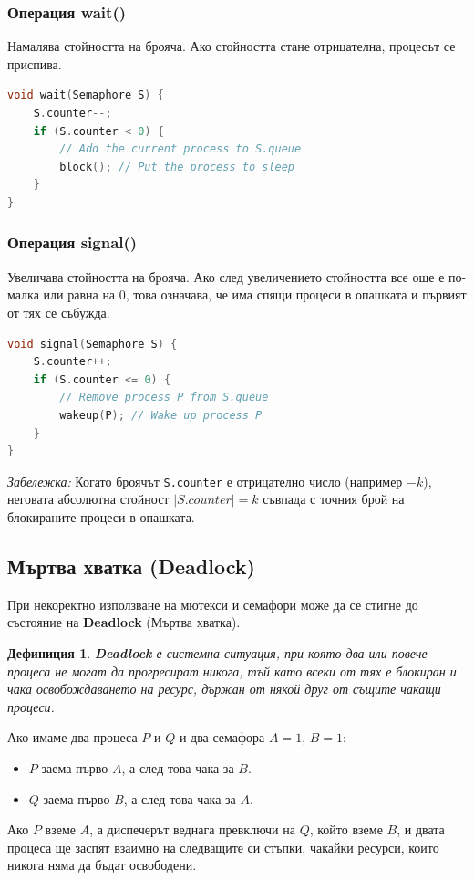 \documentclass{scrartcl}
\newtheorem{definition}{Дефиниция}
\begin{document}
\begin{FlushLeft}
\subsubsection{Операция wait()}
Намалява стойността на брояча. Ако стойността стане отрицателна, процесът се приспива.
\begin{lstlisting}[language=C++]
void wait(Semaphore S) {
    S.counter--;
    if (S.counter < 0) {
        // Add the current process to S.queue
        block(); // Put the process to sleep
    }
}
\end{lstlisting}

\subsubsection{Операция signal()}
Увеличава стойността на брояча. Ако след увеличението стойността все още е по-малка или равна на $0$, това означава, че има спящи процеси в опашката и първият от тях се събужда.
\begin{lstlisting}[language=C++]
void signal(Semaphore S) {
    S.counter++;
    if (S.counter <= 0) {
        // Remove process P from S.queue
        wakeup(P); // Wake up process P
    }
}
\end{lstlisting}

\textit{Забележка:} Когато броячът \lstinline|S.counter| е отрицателно число (например $-k$), неговата абсолютна стойност $|S.counter| = k$ съвпада с точния брой на блокираните процеси в опашката.

\subsection{Мъртва хватка (Deadlock)}
При некоректно използване на мютекси и семафори може да се стигне до състояние на \textbf{Deadlock} (Мъртва хватка).

\begin{definition}
\textbf{Deadlock} е системна ситуация, при която два или повече процеса не могат да прогресират никога, тъй като всеки от тях е блокиран и чака освобождаването на ресурс, държан от някой друг от същите чакащи процеси.
\end{definition}

Ако имаме два процеса $P$ и $Q$ и два семафора $A = 1$, $B = 1$:
\begin{itemize}
    \item $P$ заема първо $A$, а след това чака за $B$.
    \item $Q$ заема първо $B$, а след това чака за $A$.
\end{itemize}
Ако $P$ вземе $A$, а диспечерът веднага превключи на $Q$, който вземе $B$, и двата процеса ще заспят взаимно на следващите си стъпки, чакайки ресурси, които никога няма да бъдат освободени.


\end{FlushLeft}
\end{document}

